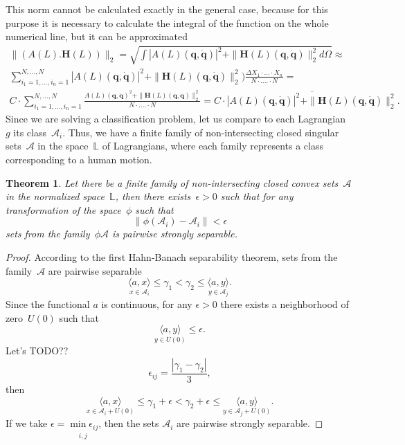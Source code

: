 \documentclass[12pt]{paper}
\newtheorem{theorem}{Theorem}
\newtheorem{proof}{Proof}
\begin{document}
This norm cannot be calculated exactly in the general case, because for this purpose it is
necessary to calculate the integral of the function on the whole numerical line, but it can be
approximated
\[
\begin{split}
\|(A(L). \mathbf{H}(L))\|_2 = \sqrt{\int |A(L)\left(\mathbf{q}, \dot{\mathbf{q}}\right)|^2 + \|\mathbf{H}(L)\left(\mathbf{q}, \dot{\mathbf{q}}\right)\|_2^2  d\Omega} \approx
\\
\sum_{i_1 = 1, ..., i_n = 1}^{N, ..., N} |A(L)\left(\mathbf{q}, \dot{\mathbf{q}}\right)|^2  + \|\mathbf{H}(L)\left(\mathbf{q}, \dot{\mathbf{q}}\right)\|_2^2) \frac{\Delta X_1 \cdot ... \cdot X_n}{N \cdot .... \cdot N} =
\\
C \cdot \sum_{i_1 = 1, ..., i_n = 1}^{N, ..., N} \frac{A(L)\left(\mathbf{q}, \dot{\mathbf{q}}\right)^2 + \|\mathbf{H}(L)\left(\mathbf{q}, \dot{\mathbf{q}}\right)\|_2^2}{N \cdot .... \cdot N} =  C \cdot \overline{|A(L)\left(\mathbf{q}, \dot{\mathbf{q}}\right)|^2 + \|\mathbf{H}(L)\left(\mathbf{q}, \dot{\mathbf{q}}\right)\|_2^2}.
\end{split}
\]
Since we are solving a classification problem, let us compare to each Lagrangian~$g$ its class~$\mathcal{A}_{i}$. Thus, we have a finite family of non-intersecting closed singular sets~$\mathcal{A}$ in the space~$\mathbb{L}$ of Lagrangians, where each family represents a class corresponding to a human motion.

\begin{theorem} \label{main_theorem}
Let there be a finite family of non-intersecting closed convex sets~$\mathcal{A}$ in the
normalized space~$\mathbb{L}$, then there exists~$\epsilon > 0$ such that for any transformation of the space~$\phi$ such that 
\[
\|\phi(\mathcal{A}_{i}) - \mathcal{A}_{i}\| < \epsilon
\]
sets from the family~$\phi{\mathcal{A}}$ is pairwise strongly separable.
\end{theorem}

\begin{proof}
According to the first Hahn-Banach separability theorem, sets from the family~$\mathcal{A}$ are
pairwise separable
\[ 
\underset{x \in \mathcal{A}_{i}}{\langle a, x \rangle}\leq \gamma_{1} < \gamma_{2} \leq \underset{y \in \mathcal{A}_{j}}{\langle a, y \rangle}.
\]
Since the functional $a$ is continuous, for any $\epsilon > 0$ there exists a neighborhood of zero~$U(0)$ such that 
\[
\underset{y \in U(0)}{\langle a, y \rangle} \leq \epsilon.
\]
Let's TODO??
\[
\epsilon_{ij} = \frac{|\gamma_{1} - \gamma_{2}|}{3},\]
then
\[
\underset{x \in \mathcal{A}_{i} + U(0)}{\langle a, x \rangle}\leq \gamma_{1} + \epsilon < \gamma_{2} + \epsilon \leq \underset{y \in \mathcal{A}_{j} + U(0)}{\langle a, y \rangle}.\]
If we take $\epsilon = \underset{i, j}{\min{\epsilon_{ij}}}$, then the sets $\mathcal{A}_{i}$ are pairwise strongly separable.
\end{proof}
\end{document}
